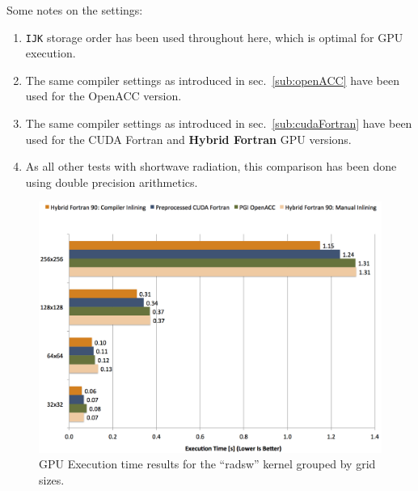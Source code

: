 Some notes on the settings:
\begin{enumerate}
 \item \verb|IJK| storage order has been used throughout here, which is optimal for GPU execution.
 \item The same compiler settings as introduced in sec.~\ref{sub:openACC} have been used for the OpenACC version.
 \item The same compiler settings as introduced in sec.~\ref{sub:cudaFortran} have been used for the CUDA Fortran and \textbf{Hybrid Fortran} GPU versions.
 \item As all other tests with shortwave radiation, this comparison has been done using double precision arithmetics.
\end{enumerate}

\begin{figure}[htpb]
        \centering
        \includegraphics[width=14cm]{figures/verificationGPUExecTime}
        \caption[GPU Execution Time Results of Sample Implementation]{GPU Execution time results for the ``radsw'' kernel grouped by grid sizes.}
        \label{figure:verificationGPUExecTime}
\end{figure}

